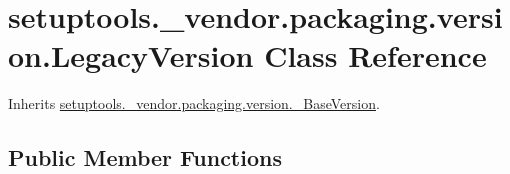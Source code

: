\hypertarget{classsetuptools_1_1__vendor_1_1packaging_1_1version_1_1_legacy_version}{}\section{setuptools.\+\_\+vendor.\+packaging.\+version.\+Legacy\+Version Class Reference}
\label{classsetuptools_1_1__vendor_1_1packaging_1_1version_1_1_legacy_version}


Inherits \hyperlink{classsetuptools_1_1__vendor_1_1packaging_1_1version_1_1___base_version}{setuptools.\+\_\+vendor.\+packaging.\+version.\+\_\+\+Base\+Version}.

\subsection*{Public Member Functions}
